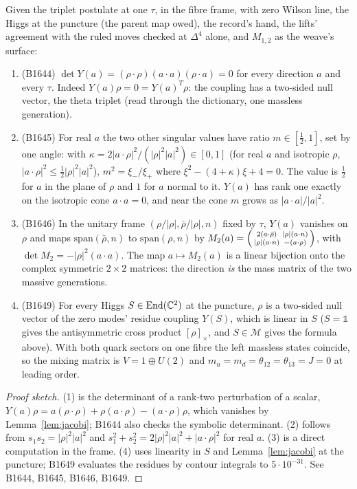 \begin{theorem}\label{thm:isotropy}
Given the triplet postulate at one $\tau$, in the fibre frame, with zero Wilson line, the Higgs at the puncture (the
parent map owed), the record's hand, the lifts' agreement with the ruled moves checked at $\Delta^4$ alone, and $M_{1,2}$
as the weave's surface:
\begin{enumerate}
\item (B1644) $\det Y(a)=(\rho\cdot\rho)(a\cdot a)(\rho\cdot a)=0$ for every direction $a$ and every $\tau$. Indeed
  $Y(a)\rho=0=Y(a)^T\rho$: the coupling has a two-sided null vector, the theta triplet (read through the dictionary, one
  massless generation).
\item (B1645) For real $a$ the two other singular values have ratio $m\in[\tfrac12,1]$, set by one angle: with
  $\kappa=2|a\cdot\rho|^2/(|\rho|^2|a|^2)\in[0,1]$ (for real $a$ and isotropic $\rho$, $|a\cdot\rho|^2\le\tfrac12|\rho|^2|a|^2$),
  $m^2=\xi_-/\xi_+$ where $\xi^2-(4+\kappa)\xi+4=0$. The value is $\tfrac12$ for $a$ in the
  plane of $\rho$ and $1$ for $a$ normal to it. $Y(a)$ has rank one exactly on the isotropic cone $a\cdot a=0$, and near
  the cone $m$ grows as $|a\cdot a|/|a|^2$.
\item (B1646) In the unitary frame $(\rho/|\rho|,\bar\rho/|\rho|,n)$ fixed by $\tau$, $Y(a)$ vanishes on $\rho$ and maps
  $\mathrm{span}(\bar\rho,n)$ to $\mathrm{span}(\rho,n)$ by
  $M_2(a)=\begin{psmallmatrix}2(a\cdot\bar\rho)&|\rho|(a\cdot n)\\|\rho|(a\cdot n)&-(a\cdot\rho)\end{psmallmatrix}$, with
  $\det M_2=-|\rho|^2(a\cdot a)$. The map $a\mapsto M_2(a)$ is a linear bijection onto the complex symmetric $2\times2$
  matrices: the direction \emph{is} the mass matrix of the two massive generations.
\item (B1649) For every Higgs $S\in\mathrm{End}(\mathbb{C}^2)$ at the puncture, $\rho$ is a two-sided null vector of the zero
  modes' residue coupling $Y(S)$, which is linear in $S$ ($S=\mathbb 1$ gives the antisymmetric cross product
  $[\rho]_\times$, and $S\in\mathcal M$ gives the formula above). With both quark sectors on one fibre the left massless
  states coincide, so the mixing matrix is $V=1\oplus U(2)$ and $m_u=m_d=\theta_{12}=\theta_{13}=J=0$ at leading order.
\end{enumerate}
\end{theorem}
\begin{proof}[Proof sketch]
(1) is the determinant of a rank-two perturbation of a scalar, $Y(a)\rho=a(\rho\cdot\rho)+\rho(a\cdot\rho)-(a\cdot\rho)\rho$,
which vanishes by Lemma~\ref{lem:jacobi}; B1644 also checks the symbolic determinant. (2) follows from
$s_1s_2=|\rho|^2|a|^2$ and $s_1^2+s_2^2=2|\rho|^2|a|^2+|a\cdot\rho|^2$ for real $a$. (3) is a direct computation in the
frame. (4) uses linearity in $S$ and Lemma~\ref{lem:jacobi} at the puncture; B1649 evaluates the residues by contour
integrals to $5\cdot10^{-31}$. See B1644, B1645, B1646, B1649.
\end{proof}
